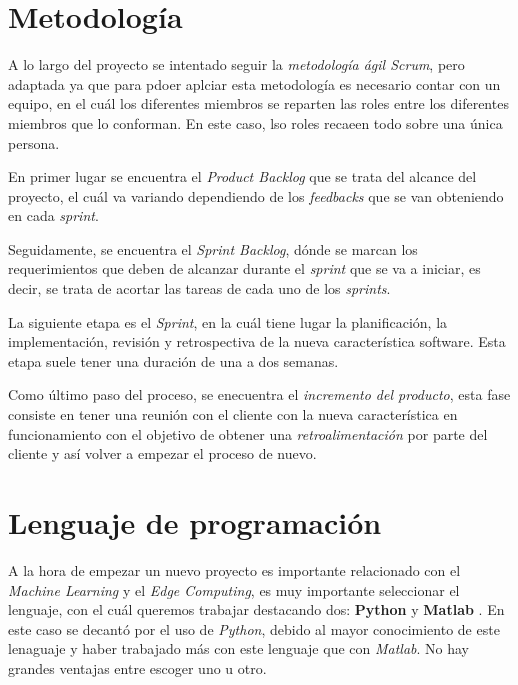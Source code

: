 
\section{Metodología}
A lo largo del proyecto se intentado seguir la \textit{metodología ágil Scrum}, pero adaptada ya que para pdoer aplciar esta metodología es necesario contar con un equipo, en el cuál los diferentes miembros se reparten las roles entre los diferentes miembros que lo conforman. En este caso, lso roles recaeen todo sobre una única persona.


En primer lugar se encuentra el \textit{Product Backlog}\cite{scrum} que se trata del alcance del proyecto, el cuál va variando dependiendo de los \textit{feedbacks} que se van obteniendo en cada \textit{sprint}.

Seguidamente, se encuentra el \textit{Sprint Backlog}, dónde se marcan los requerimientos que deben de alcanzar durante el \textit{sprint} que se va a iniciar, es decir, se trata de acortar las tareas de cada uno 
de los \textit{sprints}.

La siguiente etapa es el \textit{Sprint}, en la cuál tiene lugar la planificación, la implementación, revisión y retrospectiva de la nueva característica software.
Esta etapa suele tener una duración de una a dos semanas.

Como último paso del proceso, se enecuentra el \textit{incremento del producto}, esta fase consiste en tener una reunión con el cliente con la nueva característica en funcionamiento con el objetivo de obtener una \textit{retroalimentación} por parte del cliente y así volver a empezar el proceso de nuevo.


\section{Lenguaje de programación}
A la hora de empezar un nuevo proyecto es importante relacionado con el \textit{Machine Learning} y el \textit{Edge Computing}, es muy importante seleccionar el lenguaje, con el cuál queremos trabajar destacando dos: \textbf{Python} \cite{python} y \textbf{Matlab} \cite{matlab}.
En este caso se decantó por el uso de \textit{Python}, debido al mayor conocimiento de este lenaguaje y haber trabajado más con este lenguaje que con \textit{Matlab}.
No hay grandes ventajas entre escoger uno u otro.


